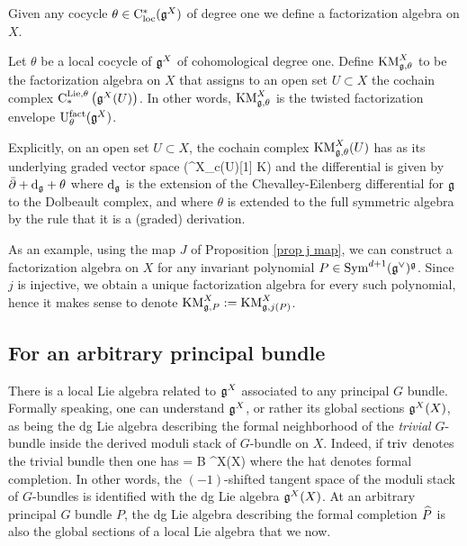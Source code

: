 \documentclass[10pt]{amsart}
\def\KM{{\rm KM}}
\begin{document}
Given any cocycle $\theta \in \cloc^*(\fg^X)$ of degree one we define a factorization algebra on $X$. 

\begin{dfn} Let $\theta$ be a local cocycle of $\fg^X$ of cohomological degree one. Define $\KM_{\fg,\theta}^X$ to be the factorization algebra on $X$ that assigns to an open set $U \subset X$ the cochain complex ${\rm C}^{{\rm Lie}, \theta}_*\left(\fg^X(U)\right)$. In other words, $\KM^X_{\fg,\theta}$ is the twisted factorization envelope ${\rm U}^{\rm fact}_\theta(\fg^X)$. 
\end{dfn}

Explicitly, on an open set $U \subset X$, the cochain complex $\KM^X_{\fg,\theta}(U)$ has as its underlying graded vector space
\ben
\Sym\left(\fg^X_{c}(U)[1] \oplus \CC \cdot K\right)
\een
and the differential is given by $\dbar + \d_\fg + \theta$ where $\d_\fg$ is the extension of the Chevalley-Eilenberg differential for $\fg$ to the Dolbeault complex, and where $\theta$ is extended to the full symmetric algebra by the rule that it is a (graded) derivation. 

\begin{eg} As an example, using the map $J$ of Proposition \ref{prop j map}, we can construct a factorization algebra on $X$ for any invariant polynomial $P \in \Sym^{d+1}(\fg^\vee)^\fg$. Since $j$ is injective, we obtain a unique factorization algebra for every such polynomial, hence it makes sense to denote $\KM^X_{\fg, P} := \KM^X_{\fg,j(P)}$. 
\end{eg}

\subsection{For an arbitrary principal bundle}

There is a local Lie algebra related to $\fg^X$ associated to any principal $G$ bundle. Formally speaking, one can understand $\fg^X$, or rather its global sections $\fg^X(X)$, as being the dg Lie algebra describing the formal neighborhood of the {\em trivial} $G$-bundle inside the derived moduli stack of $G$-bundle on $X$. Indeed, if ${\rm triv}$ denotes the trivial bundle then one has
\ben
{} = B \fg^X(X)
\een
where the hat denotes formal completion. In other words, the $(-1)$-shifted tangent space of the moduli stack of $G$-bundles is identified with the dg Lie algebra $\fg^X(X)$. At an arbitrary principal $G$ bundle $P$, the dg Lie algebra describing the formal completion $\Hat{P}$ is also the global sections of a local Lie algebra that we now. 
\end{document}
